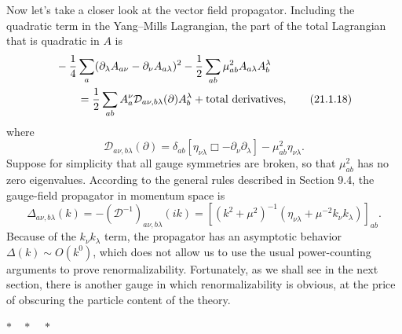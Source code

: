Now let's take a closer look at the vector field propagator. Including the
quadratic term in the Yang--Mills Lagrangian, the part of the total
Lagrangian that is quadratic in $A$ is
\begin{align}
 &-\frac14\sum_a
 (\partial_\lambda A_{a\nu}-\partial_\nu A_{a\lambda})^2
 -\frac12\sum_{ab}\mu^2_{ab}
 A_{a\lambda}A_b^\lambda
 \notag\\
 &\qquad={}
 \frac12\sum_{ab}
 A_a^\nu\mathcal D_{a\nu,b\lambda}(\partial)
 A_b^\lambda+\text{total derivatives},
 \tag{21.1.18}\label{eq:21.1.18}
\end{align}
where
\begin{equation}
 \mathcal D_{a\nu,b\lambda}(\partial)
 =\delta_{ab}
 [\eta_{\nu\lambda}\Box-\partial_\nu\partial_\lambda]
 -\mu^2_{ab}\eta_{\nu\lambda}.
 \tag{21.1.19}\label{eq:21.1.19}
\end{equation}
Suppose for simplicity that all gauge symmetries are broken, so that
$\mu^2_{ab}$ has no zero eigenvalues. According to the general
rules described in Section 9.4, the gauge-field propagator in momentum
space is
\begin{equation}
 \Delta_{a\nu,b\lambda}(k)
 =-(\mathcal D^{-1})_{a\nu,b\lambda}(ik)
 =\left[(k^2+\mu^2)^{-1}
 \left(\eta_{\nu\lambda}+\mu^{-2}k_\nu k_\lambda\right)
 \right]_{ab}.
 \tag{21.1.20}\label{eq:21.1.20}
\end{equation}
Because of the $k_\nu k_\lambda$ term, the propagator has an asymptotic
behavior $\Delta(k)\sim O(k^0)$, which does not allow us to use the usual
power-counting arguments to prove renormalizability. Fortunately, as we
shall see in the next section, there is another gauge in which
renormalizability is obvious, at the price of obscuring the particle content
of the theory.

\begin{center}
$\ast\quad\ast\quad\ast$
\end{center}

